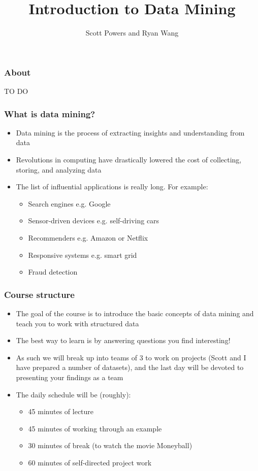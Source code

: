 \documentclass{beamer}
\title{Introduction to Data Mining}
\author{Scott Powers and Ryan Wang}
\begin{document}
\begin{frame}
\titlepage
\end{frame}


\begin{frame}
\frametitle{About}
TO DO
\end{frame}

\begin{frame}
\frametitle{What is data mining?}
\begin{itemize}
	\item Data mining is the process of extracting insights and understanding from data
	\item Revolutions in computing have drastically lowered the cost of collecting, storing, and analyzing data
	\item The list of influential applications is really long. For example:
	\begin{itemize}
		\item Search engines e.g. Google
		\item Sensor-driven devices e.g. self-driving cars
		\item Recommenders e.g. Amazon or Netflix
		\item Responsive systems e.g. smart grid
		\item Fraud detection
	\end{itemize}
\end{itemize}
\end{frame}

\begin{frame}
\frametitle{Course structure}
\begin{itemize}
	\item The goal of the course is to introduce the basic concepts of data mining and teach you to work with structured data
	\item The best way to learn is by answering questions you find interesting! 
	\item As such we will break up into teams of 3 to work on projects (Scott and I have prepared a number of datasets), and the last day will be devoted to presenting your findings as a team
	\item The daily schedule will be (roughly):
	\begin{itemize}
		\item 45 minutes of lecture
		\item 45 minutes of working through an example
		\item 30 minutes of break (to watch the movie Moneyball)
		\item 60 minutes of self-directed project work
	\end{itemize}
\end{itemize}
\end{frame}
\end{document}
